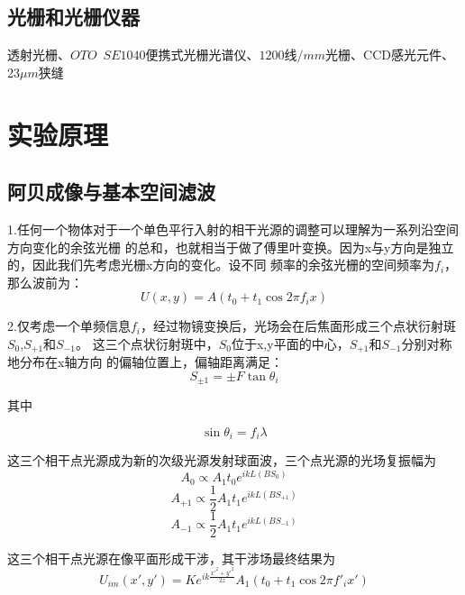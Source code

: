 \documentclass[12pt,a4paper]{article}
\begin{document}
    \subsection{光栅和光栅仪器}
    透射光栅、$OTO \enspace SE1040$便携式光栅光谱仪、$1200$线$/mm$光栅、CCD感光元件、23$\mu m$狭缝 

\section{实验原理}
    \subsection{阿贝成像与基本空间滤波}
    1.任何一个物体对于一个单色平行入射的相干光源的调整可以理解为一系列沿空间方向变化的余弦光栅
    的总和，也就相当于做了傅里叶变换。因为x与y方向是独立的，因此我们先考虑光栅x方向的变化。设不同
    频率的余弦光栅的空间频率为$f_i$，那么波前为：
    \begin{equation}
        U\left( {x,y} \right) = A\left( {{t_0} + {t_1}\cos 2\pi {f_i}x} \right)
    \end{equation}

    2.仅考虑一个单频信息$f_i$，经过物镜变换后，光场会在后焦面形成三个点状衍射斑$S_0$,$S_{+1}$和$S_{-1}$。
    这三个点状衍射斑中，$S_0$位于x,y平面的中心，$S_{+1}$和$S_{-1}$分别对称地分布在x轴方向
    的偏轴位置上，偏轴距离满足：
    \begin{equation}
        {S_{ \pm 1}} =  \pm F\tan {\theta _i}
    \end{equation}

    其中\par
    \begin{equation}
        \sin {\theta _i} = {f_i}\lambda 
    \end{equation}

    这三个相干点光源成为新的次级光源发射球面波，三个点光源的光场复振幅为
    \begin{equation}
        {A_0} \propto {A_1}{t_0}{e^{ikL\left( {B{S_0}} \right)}}
    \end{equation}
    \begin{equation}
        {A_{ + 1}} \propto \frac{1}{2}{A_1}{t_1}{e^{ikL\left( {BS{ _{ + 1}}} \right)}}
    \end{equation}
    \begin{equation}
        {A_{ - 1}} \propto \frac{1}{2}{A_1}{t_1}{e^{ikL\left( {B{S_{ - 1}}} \right)}}
    \end{equation}

    这三个相干点光源在像平面形成干涉，其干涉场最终结果为
    \begin{equation}
        {U_{im}}\left( {x',y'} \right) = K{e^{ik\frac{{{{x'}^2} + {{y'}^2}}}{{2z}}}}{A_1}\left( {{t_0} + {t_1}\cos 2\pi {{f'}_i}x'} \right)
    \end{equation}
\end{document}
